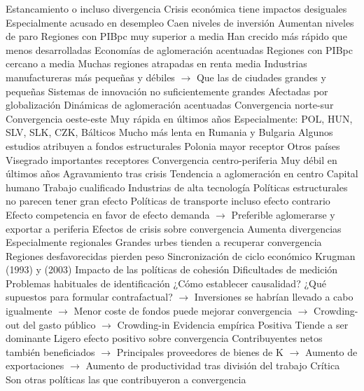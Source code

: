 \documentclass{nuevotema}
\begin{document}
\begin{esquemal}
				\4 Estancamiento o incluso divergencia
				\4[] Crisis económica tiene impactos desiguales
				\4[] Especialmente acusado en desempleo
				\4 Caen niveles de inversión
				\4 Aumentan niveles de paro
				\4 Regiones con PIBpc muy superior a media
				\4[] Han crecido más rápido que menos desarrolladas
				\4[] Economías de aglomeración acentuadas
				\4 Regiones con PIBpc cercano a media
				\4[] Muchas regiones atrapadas en renta media
				\4[] Industrias manufactureras más pequeñas y débiles
				\4[] $\to$ Que las de ciudades grandes y pequeñas
				\4[] Sistemas de innovación no suficientemente grandes
				\4[] Afectadas por globalización
				\4 Dinámicas de aglomeración acentuadas
			\3 Convergencia norte-sur
			\3 Convergencia oeste-este
				\4 Muy rápida en últimos años
				\4 Especialmente:
				\4[] POL, HUN, SLV, SLK, CZK, Bálticos
				\4 Mucho más lenta en Rumania y Bulgaria
				\4 Algunos estudios atribuyen a fondos estructurales
				\4[] Polonia mayor receptor
				\4[] Otros países Visegrado importantes receptores
			\3 Convergencia centro-periferia
				\4 Muy débil en últimos años
				\4 Agravamiento tras crisis
				\4 Tendencia a aglomeración en centro
				\4[] Capital humano
				\4[] Trabajo cualificado
				\4[] Industrias de alta tecnología
				\4 Políticas estructurales no parecen tener gran efecto
				\4 Políticas de transporte incluso efecto contrario
				\4[] Efecto competencia en favor de efecto demanda
				\4[] $\to$ Preferible aglomerarse y exportar a periferia
			\3 Efectos de crisis sobre convergencia
				\4 Aumenta divergencias
				\4[] Especialmente regionales
				\4 Grandes urbes tienden a recuperar convergencia
				\4 Regiones desfavorecidas pierden peso
			\3 Sincronización de ciclo económico
				\4 Krugman (1993) y (2003)
		\2 Impacto de las políticas de cohesión
			\3 Dificultades de medición
				\4 Problemas habituales de identificación
				\4[] ¿Cómo establecer causalidad?
				\4[] ¿Qué supuestos para formular contrafactual?
				\4[] $\to$ Inversiones se habrían llevado a cabo igualmente
				\4[] $\to$ Menor coste de fondos puede mejorar convergencia
				\4[] $\to$ Crowding-out del gasto público
				\4[] $\to$ Crowding-in
				\4 Evidencia empírica
				\4 Positiva
				\4[] Tiende a ser dominante
				\4[] Ligero efecto positivo sobre convergencia
				\4[] Contribuyentes netos también beneficiados
				\4[] $\to$ Principales proveedores de bienes de K
				\4[] $\to$ Aumento de exportaciones
				\4[] $\to$ Aumento de productividad tras división del trabajo
				\4 Crítica
				\4[] Son otras políticas las que contribuyeron a convergencia

\end{esquemal}
\end{document}

